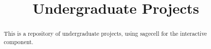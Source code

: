 \documentclass{xourse}
\title{Undergraduate  Projects}%
\begin{document}
      
\begin{abstract} %
This is a repository of undergraduate  projects, using sagecell for the interactive component.
\end{abstract}
      
\maketitle
      


      
\end{document}

